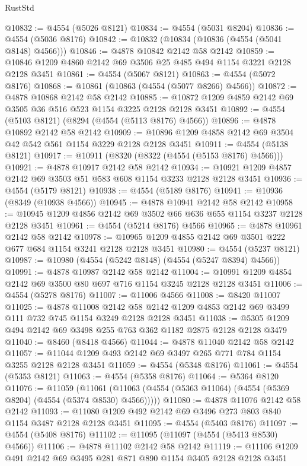 \begin{lexlean}{RustStd}
\begin{coremodule}
@10832 := @4554 (@5026 @8121)
@10834 := @4554 (@5031 @8204)
@10836 := @4554 (@5036 @8176)
@10842 := @10832 (@10834 (@10836 (@4554 (@5041 @8148) @4566)))
@10846 := @4878 @10842 @2142 @58 @2142
@10859 := @10846 @1209 @4860 @2142 @69 @3506 @25 @485 @494 @1154 @3221 @2128 @2128 @3451
@10861 := @4554 (@5067 @8121)
@10863 := @4554 (@5072 @8176)
@10868 := @10861 (@10863 (@4554 (@5077 @8266) @4566))
@10872 := @4878 @10868 @2142 @58 @2142
@10885 := @10872 @1209 @4859 @2142 @69 @3505 @36 @516 @523 @1154 @3225 @2128 @2128 @3451
@10892 := @4554 (@5103 @8121) (@8294 (@4554 (@5113 @8176) @4566))
@10896 := @4878 @10892 @2142 @58 @2142
@10909 := @10896 @1209 @4858 @2142 @69 @3504 @42 @542 @561 @1154 @3229 @2128 @2128 @3451
@10911 := @4554 (@5138 @8121)
@10917 := @10911 (@8320 (@8322 (@4554 (@5153 @8176) @4566)))
@10921 := @4878 @10917 @2142 @58 @2142
@10934 := @10921 @1209 @4857 @2142 @69 @3503 @51 @583 @608 @1154 @3233 @2128 @2128 @3451
@10936 := @4554 (@5179 @8121)
@10938 := @4554 (@5189 @8176)
@10941 := @10936 (@8349 (@10938 @4566))
@10945 := @4878 @10941 @2142 @58 @2142
@10958 := @10945 @1209 @4856 @2142 @69 @3502 @66 @636 @655 @1154 @3237 @2128 @2128 @3451
@10961 := @4554 (@5214 @8176) @4566
@10965 := @4878 @10961 @2142 @58 @2142
@10978 := @10965 @1209 @4855 @2142 @69 @3501 @222 @677 @684 @1154 @3241 @2128 @2128 @3451
@10980 := @4554 (@5237 @8121)
@10987 := @10980 (@4554 (@5242 @8148) (@4554 (@5247 @8394) @4566))
@10991 := @4878 @10987 @2142 @58 @2142
@11004 := @10991 @1209 @4854 @2142 @69 @3500 @80 @697 @716 @1154 @3245 @2128 @2128 @3451
@11006 := @4554 (@5278 @8176)
@11007 := @11006 @4566
@11008 := @8420 @11007
@11025 := @4878
    @11008
    @2142
    @58
    @2142
    @1209
    @4853
    @2142
    @69
    @3499
    @111
    @732
    @745
    @1154
    @3249
    @2128
    @2128
    @3451
@11038 := @5305 @1209 @494 @2142 @69 @3498 @255 @763 @362 @1182 @2875 @2128 @2128 @3479
@11040 := @8460 (@8418 @4566)
@11044 := @4878 @11040 @2142 @58 @2142
@11057 := @11044 @1209 @493 @2142 @69 @3497 @265 @771 @784 @1154 @3255 @2128 @2128 @3451
@11059 := @4554 (@5348 @8176)
@11061 := @4554 (@5353 @8121)
@11063 := @4554 (@5358 @8176)
@11064 := @5364 @8120
@11076 := @11059
    (@11061 (@11063 (@4554 (@5363 @11064) (@4554 (@5369 @8204) (@4554 (@5374 @8530) @4566)))))
@11080 := @4878 @11076 @2142 @58 @2142
@11093 := @11080 @1209 @492 @2142 @69 @3496 @273 @803 @840 @1154 @3487 @2128 @2128 @3451
@11095 := @4554 (@5403 @8176)
@11097 := @4554 (@5408 @8176)
@11102 := @11095 (@11097 (@4554 (@5413 @8530) @4566))
@11106 := @4878 @11102 @2142 @58 @2142
@11119 := @11106 @1209 @491 @2142 @69 @3495 @281 @871 @890 @1154 @3405 @2128 @2128 @3451

\end{coremodule}
\end{lexlean}
